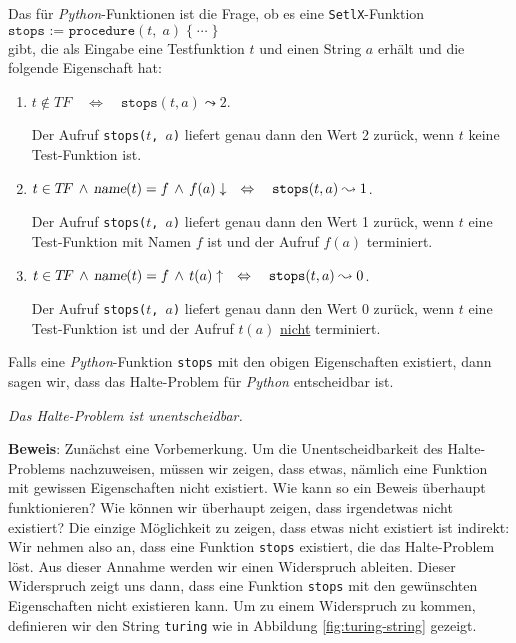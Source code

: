 \noindent
Das  für
\textsl{Python}-Funktionen ist die Frage, ob es eine \texttt{SetlX}-Funktion \\[0.1cm] 
\hspace*{1.3cm} 
$\texttt{stops := procedure}(t,\;a)\; \{\;\cdots\;\}$ \\[0.1cm]
gibt, die als Eingabe eine Testfunktion $t$ und einen String $a$ erhält und die folgende
Eigenschaft hat:
\begin{enumerate}
\item $t \not\in T\!F \quad\Leftrightarrow\quad \texttt{stops}(t, a) \leadsto 2$.

      Der Aufruf \texttt{stops($t$, $a$)} liefert genau dann den Wert 2 zurück, 
      wenn $t$ keine Test-Funktion ist.
\item $t \in T\!F \,\wedge\, \textsl{name}(t) = f \,\wedge\, f(a)\downarrow \quad\Leftrightarrow\quad
       \texttt{stops}(t, a) \leadsto 1$.

      Der Aufruf \texttt{stops($t$, $a$)} liefert genau dann den Wert 1 zurück,
      wenn $t$ eine Test-Funktion mit Namen $f$ ist und der Aufruf $f(a)$ terminiert.

\item $t \in T\!F  \,\wedge\, \textsl{name}(t) = f \,\wedge\, t(a)\uparrow \quad\Leftrightarrow\quad
       \texttt{stops}(t, a) \leadsto 0$.

      Der Aufruf \texttt{stops($t$, $a$)} liefert genau dann den Wert 0 zurück,
      wenn $t$ eine Test-Funktion ist und der Aufruf $t(a)$ \underline{nicht} terminiert.
\end{enumerate}
Falls eine \textsl{Python}-Funktion \texttt{stops} mit den obigen Eigenschaften existiert, dann
sagen wir, dass das Halte-Problem für \textsl{Python} entscheidbar ist.

\begin{Theorem}
{\em
  Das Halte-Problem ist unentscheidbar.
} 
\end{Theorem}

\noindent
\textbf{Beweis}:  Zunächst eine Vorbemerkung.  Um die Unentscheidbarkeit des
Halte-Problems nachzuweisen, müssen wir zeigen, dass etwas, nämlich eine Funktion mit
gewissen Eigenschaften nicht existiert.  Wie kann so ein Beweis überhaupt funktionieren?
Wie können wir überhaupt zeigen, dass irgendetwas nicht existiert?
Die einzige Möglichkeit zu zeigen, dass etwas nicht existiert ist indirekt:
Wir nehmen also an, dass eine Funktion \texttt{stops} existiert, die das Halte-Problem löst.
Aus dieser Annahme werden wir einen Widerspruch ableiten.  Dieser Widerspruch zeigt
uns dann, dass eine Funktion \texttt{stops} mit den gewünschten Eigenschaften nicht
existieren kann.
Um zu einem Widerspruch zu kommen, definieren wir den String \texttt{turing} wie in Abbildung
\ref{fig:turing-string} gezeigt.

